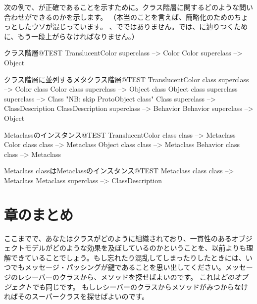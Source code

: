 \documentclass[a4paper,10pt,twoside]{book}
\begin{document}
次の例で、が正確であることを示すために。クラス階層に関するどのような問い合わせができるのかを示します。
（本当のことを言えば、簡略化のためのちょっとしたウソが混じっています。 、でではありません。\pharo では、に辿りつくために、もう一段上がらなければなりません。）

\begin{example}{クラス階層}{@TEST}
TranslucentColor superclass --> Color
Color superclass                   --> Object
\end{example}

\begin{example}{クラス階層に並列するメタクラス階層}{@TEST}
TranslucentColor class superclass   --> Color class
Color class superclass                     --> Object class
Object class superclass superclass --> Class    "NB: skip ProtoObject class"
Class superclass                              --> ClassDescription
ClassDescription superclass            --> Behavior
Behavior superclass                         --> Object
\end{example}

\begin{example}{Metaclassのインスタンス}{@TEST}
TranslucentColor class class --> Metaclass
Color class class                   --> Metaclass
Object class class                 --> Metaclass
Behavior class class              --> Metaclass
\end{example}
\begin{example}{Metaclass classはMetaclassのインスタンス}{@TEST}
Metaclass class class --> Metaclass
Metaclass superclass --> ClassDescription
\end{example}

\section{章のまとめ}
ここまでで、あなたはクラスがどのように組織されており、一貫性のあるオブジェクトモデルがどのような効果を及ぼしているのかということを、以前よりも理解できていることでしょう。もし忘れたり混乱してしまったりしたときには、いつでもメッセージ・パッシングが鍵であることを思い出してください。メッセージのレシーバーのクラスから、メソッドを探せばよいのです。
これは\emph{どのオブジェクトでも}同じです。
もしレシーバーのクラスからメソッドがみつからなければそのスーパークラスを探せばよいのです。
\end{document}
